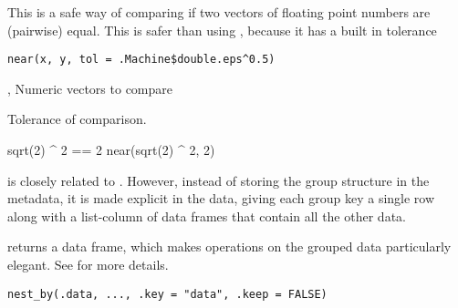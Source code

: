 \documentclass[a4paper]{book}
\begin{document}
%
\begin{Description}
This is a safe way of comparing if two vectors of floating point numbers
are (pairwise) equal.  This is safer than using \code{==}, because it has
a built in tolerance
\end{Description}
%
\begin{Usage}
\begin{verbatim}
near(x, y, tol = .Machine$double.eps^0.5)
\end{verbatim}
\end{Usage}
%
\begin{Arguments}
\begin{ldescription}
\item[\code{x}, \code{y}] Numeric vectors to compare

\item[\code{tol}] Tolerance of comparison.
\end{ldescription}
\end{Arguments}
%
\begin{Examples}
\begin{ExampleCode}
sqrt(2) ^ 2 == 2
near(sqrt(2) ^ 2, 2)
\end{ExampleCode}
\end{Examples}
%
\begin{Description}
\strong{[Experimental]}

 is closely related to . However, instead of storing
the group structure in the metadata, it is made explicit in the data,
giving each group key a single row along with a list-column of data frames
that contain all the other data.

 returns a  data frame, which makes operations on the
grouped data particularly elegant. See  for more
details.
\end{Description}
%
\begin{Usage}
\begin{verbatim}
nest_by(.data, ..., .key = "data", .keep = FALSE)
\end{verbatim}
\end{Usage}
%
\end{document}

